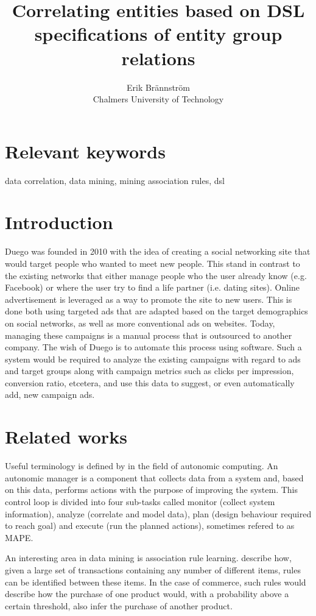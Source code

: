 \documentclass[a4paper]{article}
\begin{document}
\title{Correlating entities based on DSL specifications of entity group relations}
\author{Erik Brännström\\
  Chalmers University of Technology}
\date{}
\maketitle

\section{Relevant keywords}
data correlation, data mining, mining association rules, dsl

\section{Introduction}
Duego was founded in 2010 with the idea of creating a social networking site that would target people who wanted to meet new people. This stand in contrast to the existing networks that either manage people who the user already know (e.g. Facebook) or where the user try to find a life partner (i.e. dating sites).
Online advertisement is leveraged as a way to promote the site to new users. This is done both using targeted ads that are adapted based on the target demographics on social networks, as well as more conventional ads on websites. Today, managing these campaigns is a manual process that is outsourced to another company.
The wish of Duego is to automate this process using software. Such a system would be required to analyze the existing campaigns with regard to ads and target groups along with campaign metrics such as clicks per impression, conversion ratio, etcetera, and use this data to suggest, or even automatically add, new campaign ads.

\section{Related works}
Useful terminology is defined by \citet{IBM2006} in the field of autonomic computing. An autonomic manager is a component that collects data from a system and, based on this data, performs actions with the purpose of improving the system. This control loop is divided into four sub-tasks called monitor (collect system information), analyze (correlate and model data), plan (design behaviour required to reach goal) and execute (run the planned actions), sometimes refered to as MAPE.

An interesting area in data mining is association rule learning. \citet{Agrawal1993} describe how, given a large set of transactions containing any number of different items, rules can be identified between these items. In the case of commerce, such rules would describe how the purchase of one product would, with a probability above a certain threshold, also infer the purchase of another product.
\end{document}
